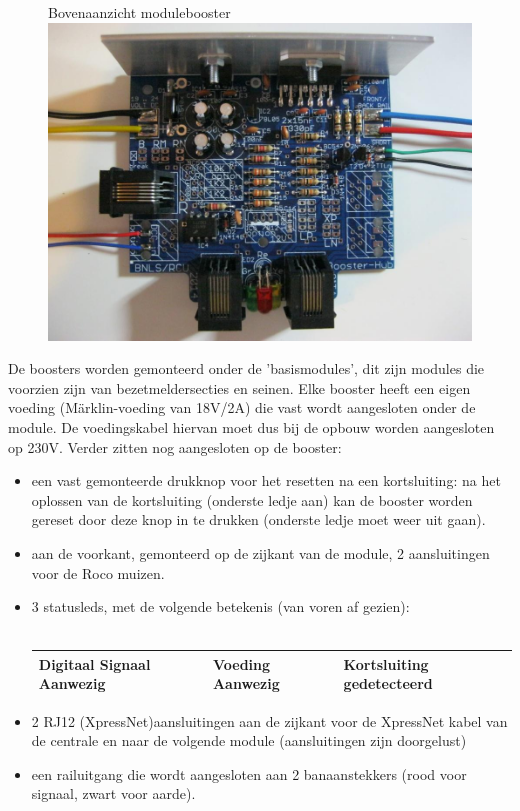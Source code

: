 \documentclass[12pt,a4paper]{report}
\newcommand*{\marklin}{M\"{a}rklin}
\begin{document}
\begin{figure}[h]
  \captionbox
  {Bovenaanzicht modulebooster\label{modulebooster}}
  {\includegraphics[scale=0.5]{images/rcu_foto3}\\}
\end{figure}

De boosters worden gemonteerd onder de 'basismodules', dit zijn modules die voorzien zijn van bezetmeldersecties en seinen. Elke booster heeft een eigen voeding (\marklin-voeding van 18V/2A) die vast wordt aangesloten onder de module. De voedingskabel hiervan moet dus bij de opbouw worden aangesloten op 230V.
Verder zitten nog aangesloten op de booster:
\begin{itemize}
\item een vast gemonteerde drukknop voor het resetten na een kortsluiting: na het oplossen van de kortsluiting (onderste ledje aan) kan de booster worden gereset door deze knop in te drukken (onderste ledje moet weer uit gaan).
\item aan de voorkant, gemonteerd op de zijkant van de module, 2 aansluitingen voor de Roco muizen.
\item 3 statusleds, met de volgende betekenis (van voren af gezien):\\
\\
\begin{tabular}{|l|l|l|}
\hline
Digitaal Signaal Aanwezig&Voeding Aanwezig&Kortsluiting gedetecteerd\\
\hline
\end{tabular}
\item 2 RJ12 (XpressNet)aansluitingen aan de zijkant voor de XpressNet kabel van de centrale en naar de volgende module (aansluitingen zijn doorgelust)
\item een railuitgang die wordt aangesloten aan 2 banaanstekkers (rood voor signaal, zwart voor aarde).
\end{itemize}
\end{document}
